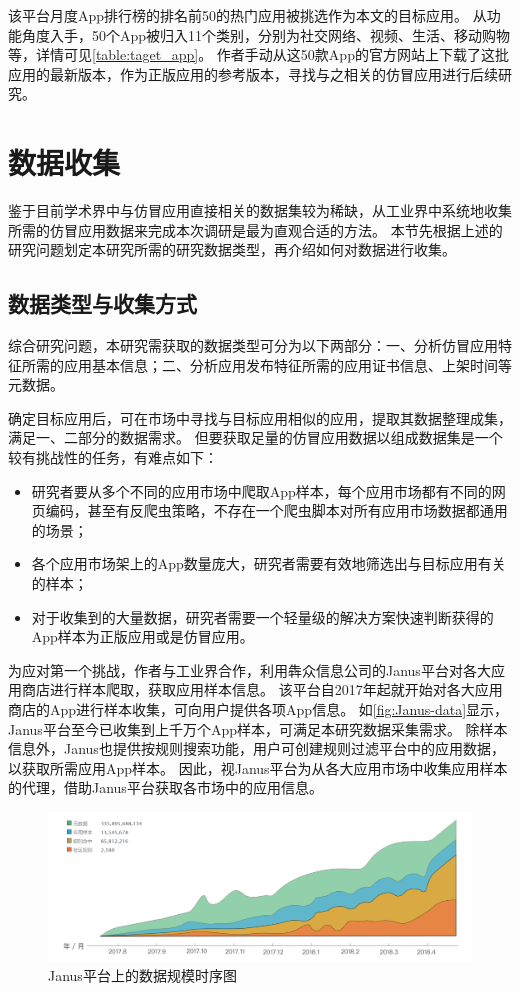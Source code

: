 该平台月度App排行榜的排名前50的热门应用被挑选作为本文的目标应用。
从功能角度入手，50个App被归入11个类别，分别为社交网络、视频、生活、移动购物等，详情可见\autoref{table:taget_app}。
作者手动从这50款App的官方网站上下载了这批应用的最新版本，作为正版应用的参考版本，寻找与之相关的仿冒应用进行后续研究。


\section{数据收集}
鉴于目前学术界中与仿冒应用直接相关的数据集较为稀缺，从工业界中系统地收集所需的仿冒应用数据来完成本次调研是最为直观合适的方法。
本节先根据上述的研究问题划定本研究所需的研究数据类型，再介绍如何对数据进行收集。

\subsection{数据类型与收集方式}

综合研究问题，本研究需获取的数据类型可分为以下两部分：一、分析仿冒应用特征所需的应用基本信息；二、分析应用发布特征所需的应用证书信息、上架时间等元数据。

确定目标应用后，可在市场中寻找与目标应用相似的应用，提取其数据整理成集，满足一、二部分的数据需求。
但要获取足量的仿冒应用数据以组成数据集是一个较有挑战性的任务，有难点如下：
\begin{itemize}
	\item 研究者要从多个不同的应用市场中爬取App样本，每个应用市场都有不同的网页编码，甚至有反爬虫策略，不存在一个爬虫脚本对所有应用市场数据都通用的场景；
	\item 各个应用市场架上的App数量庞大，研究者需要有效地筛选出与目标应用有关的样本；
	\item 对于收集到的大量数据，研究者需要一个轻量级的解决方案快速判断获得的App样本为正版应用或是仿冒应用。
\end{itemize}

为应对第一个挑战，作者与工业界合作，利用犇众信息公司的Janus平台对各大应用商店进行样本爬取，获取应用样本信息。
该平台自2017年起就开始对各大应用商店的App进行样本收集，可向用户提供各项App信息。
如\autoref{fig:Janus-data}显示，Janus平台至今已收集到上千万个App样本，可满足本研究数据采集需求。
除样本信息外，Janus也提供按规则搜索功能，用户可创建规则过滤平台中的应用数据，以获取所需应用App样本。
因此，视Janus平台为从各大应用市场中收集应用样本的代理，借助Janus平台获取各市场中的应用信息。

\begin{figure}[htbp]
	\centering
	\includegraphics[width=\textwidth]{./Figures/edwin-Janus-data.png}
	\caption{Janus平台上的数据规模时序图}
	\label{fig:Janus-data}
	\vspace{-5mm}
\end{figure}


